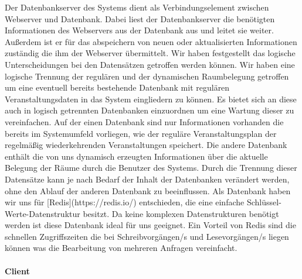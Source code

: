 Der Datenbankserver des Systems dient als Verbindungselement zwischen Webserver
und Datenbank. Dabei liest der Datenbankserver die benötigten Informationen des
Webservers aus der Datenbank aus und leitet sie weiter. Außerdem ist er für das
abspeichern von neuen oder aktualisierten Informationen zuständig die ihm der
Webserver übermittelt.
Wir haben festgestellt das logische Unterscheidungen bei den Datensätzen
getroffen werden können. Wir haben eine logische Trennung der regulären und der
dynamischen Raumbelegung getroffen um eine eventuell bereits bestehende
Datenbank mit regulären Veranstaltungsdaten in das System eingliedern zu
können. Es bietet sich an diese auch in logisch getrennten Datenbanken
einzuordnen um eine Wartung dieser zu vereinfachen. Auf der einen Datenbank
sind nur Informationen vorhanden die bereits im Systemumfeld vorliegen,
wie \zB der reguläre Veranstaltungsplan der regelmäßig wiederkehrenden
Veranstaltungen speichert. Die andere Datenbank enthält die von uns dynamisch
erzeugten Informationen über die aktuelle Belegung der Räume durch die Benutzer
des Systems. Durch die Trennung dieser Datensätze kann je nach Bedarf der Inhalt
der Datenbanken verändert werden, ohne den Ablauf der anderen Datenbank zu
beeinflussen.
Als Datenbank haben wir uns für [Redis](https://redis.io/) entschieden, die
eine einfache Schlüssel-Werte-Datenstruktur besitzt. Da keine komplexen
Datenstrukturen benötigt werden ist diese Datenbank ideal für uns geeignet.
Ein Vorteil von Redis sind die schnellen Zugriffszeiten die bei 
Schreibvorgängen/s und  Lesevorgängen/s liegen können was die
Bearbeitung von mehreren Anfragen vereinfacht.

\paragraph{Client}
\label{sec:Client}

